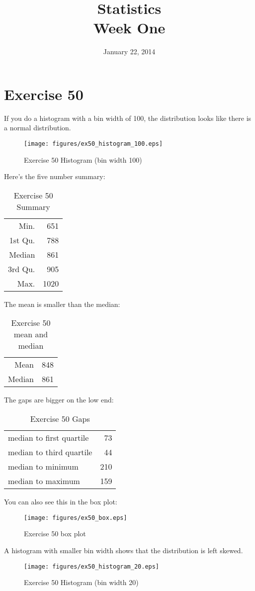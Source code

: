 \documentclass{exam}
\author{}
\date{January 22, 2014}
\title{Statistics \\ Week One}
\begin{document}
\maketitle
\tableofcontents

  \section{Exercise 50}
  If you do a histogram with a bin width of 100, the distribution looks like there
  is a normal distribution.

  \begin{figure}[H]
    \centering
    \texttt{[image: figures/ex50\_histogram\_100.eps]}
    \caption{Exercise 50 Histogram (bin width 100)}
  \end{figure}

  Here's the five number summary:
  \begin{table}[H]
    \centering
    \begin{tabular}{rr}
      \toprule
      Min.    & 651 \\
      1st Qu. & 788 \\
      Median  & 861 \\
      3rd Qu. & 905 \\
      Max.    & 1020 \\
      \bottomrule
    \end{tabular}
    \caption{Exercise 50 Summary}
  \end{table}

  The mean is smaller than the median:
  \begin{table}[H]
    \centering
    \begin{tabular}{rr}
      \toprule
      Mean    & 848 \\
      Median  & 861 \\
      \bottomrule
    \end{tabular}
    \caption{Exercise 50 mean and median}
  \end{table}

  The gaps are bigger on the low end:
  \begin{table}[H]
    \centering
    \begin{tabular}{lr}
      \toprule
      median to first quartile & 73 \\
      median to third quartile & 44 \\
      \midrule
      median to minimum & 210 \\
      median to maximum & 159 \\
      \bottomrule
    \end{tabular}
    \caption{Exercise 50 Gaps}
  \end{table}

  You can also see this in the box plot:
  \begin{figure}[H]
    \centering
    \texttt{[image: figures/ex50\_box.eps]}
    \caption{Exercise 50 box plot}
  \end{figure}

  A histogram with smaller bin width shows that the distribution is left skewed.
  \begin{figure}[H]
    \centering
    \texttt{[image: figures/ex50\_histogram\_20.eps]}
    \caption{Exercise 50 Histogram (bin width 20)}
  \end{figure}
\end{document}
